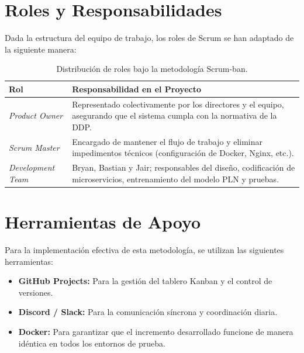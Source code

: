 \section{Roles y Responsabilidades}
Dada la estructura del equipo de trabajo, los roles de Scrum se han adaptado de la siguiente manera:
\begin{table}[htbp]
\centering
\small
\begin{tabular}{|l|p{9cm}|}
\hline
\textbf{Rol} & \textbf{Responsabilidad en el Proyecto} \\ \hline
\textit{Product Owner} & Representado colectivamente por los directores y el equipo, asegurando que el sistema cumpla con la normativa de la DDP. \\ \hline
\textit{Scrum Master} & Encargado de mantener el flujo de trabajo y eliminar impedimentos técnicos (configuración de Docker, Nginx, etc.). \\ \hline
\textit{Development Team} & Bryan, Bastian y Jair; responsables del diseño, codificación de microservicios, entrenamiento del modelo PLN y pruebas. \\ \hline
\end{tabular}
\caption{Distribución de roles bajo la metodología Scrum-ban.}
\end{table}

\section{Herramientas de Apoyo}
Para la implementación efectiva de esta metodología, se utilizan las siguientes herramientas:
\begin{itemize}
    \item \textbf{GitHub Projects:} Para la gestión del tablero Kanban y el control de versiones.
    \item \textbf{Discord / Slack:} Para la comunicación síncrona y coordinación diaria.
    \item \textbf{Docker:} Para garantizar que el incremento desarrollado funcione de manera idéntica en todos los entornos de prueba.
\end{itemize}